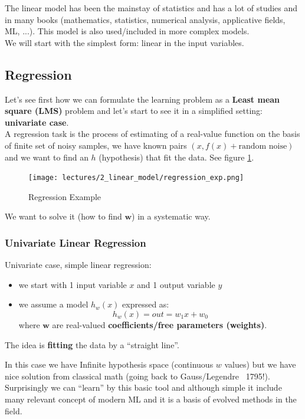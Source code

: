 \documentclass[../main.tex]{subfiles}
\begin{document}
The linear model has been the mainstay of statistics and has a lot of studies and in many books (mathematics, statistics, numerical analysis, applicative fields, ML, ...). This model is also used/included in more complex models.\\

We will start with the simplest form: linear in the input variables.

\subsection{Regression}
Let's see first how we can formulate the learning problem as a \textbf{Least mean square (LMS)} problem and let's start to see it in a simplified setting: \textbf{univariate case}.\\

A regression task is the process of estimating of a real-value function on the basis of finite set of noisy samples, we have known pairs $(x, f(x) + \text{random noise})$ and we want to find an $h$ (hypothesis) that fit the data. See figure \ref{fig:linear_model_regression_exp}.
\begin{figure}
    \centering
    \texttt{[image: lectures/2\_linear\_model/regression\_exp.png]}
    \caption{Regression Example}
    \label{fig:linear_model_regression_exp}
\end{figure}

We want to solve it (how to find $\mathbf{w}$) in a systematic way.

\subsubsection{Univariate Linear Regression}

Univariate case, simple linear regression:
\begin{itemize}
    \item we start with 1 input variable $x$ and 1 output variable $y$
    
    \item we assume a model $h_w(x)$ expressed as:
    $$ h_w(x) = out = w_1x + w_0$$
    where $\mathbf{w}$ are real-valued \textbf{coefficients/free parameters (weights)}.
\end{itemize}

\begin{center}
    The idea is \textbf{fitting} the data by a  “straight line”.
\end{center}

In this case we have Infinite hypothesis space (continuous $w$ values) but we have nice solution from classical math (going back to Gauss/Legendre ~1795!).\\
Surprisingly we can “learn” by this basic tool and although simple it include many relevant concept of modern ML and it is
a basis of evolved methods in the field.\\
\end{document}
